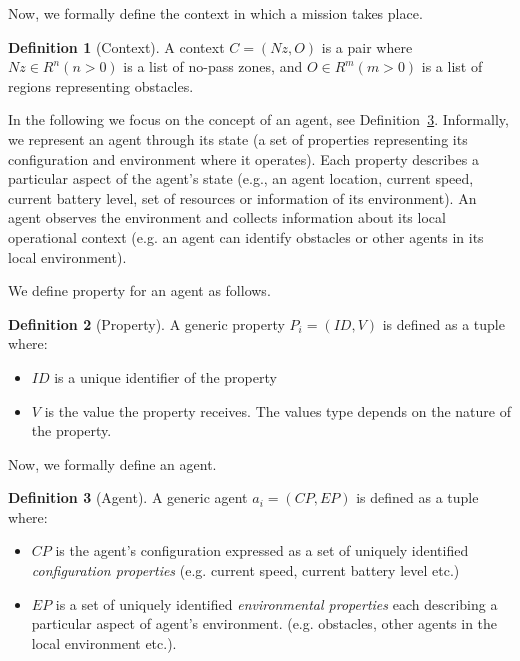 \documentclass[journal]{IEEEtran}
\theoremstyle{definition}
\newtheorem{definition}{Definition}
\newcommand\patrizio[1]{\nb{Patrizio}{#1}}
\newcommand\ivano[1]{\nb{Ivano}{#1}}
\begin{document}
Now, we formally define the context in which a mission takes place.

\begin{definition}[Context]
A context $C=(Nz, O)$ is a pair
where $Nz \in R^n (n>0)$ is a list of no-pass zones, and $O \in R^m (m>0)$
is a list of regions representing obstacles.
\end{definition}




In  the  following  we  focus  on  the  concept  of  an agent,  see Definition~\ref{def:Agent}. 
Informally, we represent an agent through its state (a set of  properties representing its configuration %
and environment where it operates). Each property describes a particular aspect of the agent's state (e.g., an agent location, current speed, current battery level, set of resources or information of its  environment). An agent observes the environment and collects information about its local operational context (e.g. an agent can identify obstacles or other agents in its local environment).

We define property for an agent as follows.

\begin{definition}[Property]
A generic property $P_i=(ID, V)$ is defined as a tuple where:
\begin{itemize}
\item $ID$ is a unique identifier of the property
\item $V$ is the value the property receives. The values type depends on the nature of the property.
\end{itemize}
\end{definition}

Now, we  formally define an agent. 

\begin{definition}[Agent]\label{def:Agent} 
A generic agent $a_i=(CP, EP)$ is defined as a tuple %
where:
\begin{itemize}
\item $CP$ is the agent's configuration expressed as a set of uniquely identified \textit{configuration properties} (e.g. current speed, current battery level etc.)
\item $EP$ is a set of uniquely identified \textit{environmental properties} each describing a particular aspect of agent's environment. (e.g. obstacles, other agents in the local environment etc.). 
\end{itemize}
\end{definition}
\end{document}
